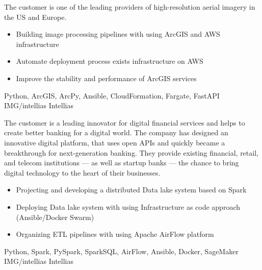 \documentclass[paper=a4,fontsize=11pt]{temp} %
\begin{document}

\noindent


{The customer is one of the leading providers of high-resolution aerial imagery in the US and Europe.}
{
\begin{itemize}
    \setlength\itemsep{0em}
    \item Building image processing pipelines with using ArcGIS and AWS infrastructure
    \item Automate deployment process exists infrastructure on AWS
    \item Improve the stability and performance of ArcGIS services
\end{itemize}
}
{Python, ArcGIS, ArcPy, Ansible, CloudFormation, Fargate, FastAPI}
{IMG/intellias}
{Intellias}

\sepspace

{The customer is a leading innovator for digital financial services and helps to create better banking for a digital world.
The company has designed an innovative digital platform, that uses open APIs and quickly became a breakthrough for
next-generation banking. They provide existing financial, retail, and telecom institutions — as well as startup banks —
the chance to bring digital technology to the heart of their businesses.}
{
\begin{itemize}
    \setlength\itemsep{0em}
    \item Projecting and developing a distributed Data lake system based on Spark
    \item Deploying Data lake system with using Infrastructure as code approach (Ansible/Docker Swarm)
    \item Organizing ETL pipelines with using Apache AirFlow platform
\end{itemize}
}
{Python, Spark, PySpark, SparkSQL, AirFlow, Ansible, Docker, SageMaker}
{IMG/intellias}
{Intellias}

\sepspace
\end{document}

